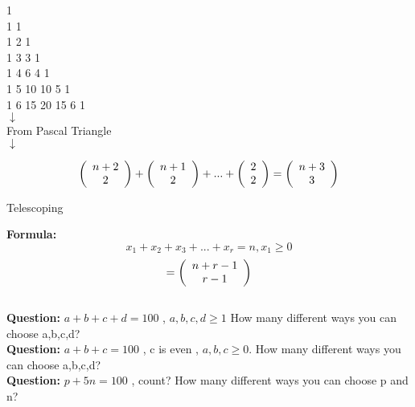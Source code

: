 \documentclass[11pt]{article}
\begin{document}
\begin{center}
1\\1 1\\1 2 1\\1 3 3 1\\1 4 6 4 1\\1 5 10 10 5 1\\1 6 15 20 15 6 1\\
$\downarrow$\\
From Pascal Triangle\\
$\downarrow$
\end{center}

$$\left( {\begin{array}{*{20}c} n+2  \\ 2  \\ \end{array}} \right) + \left( {\begin{array}{*{20}c} n+1  \\ 2  \\ \end{array}} \right) + ... + \left( {\begin{array}{*{20}c} 2  \\ 2  \\ \end{array}} \right) = \left( {\begin{array}{*{20}c} n+3 \\ 3  \\ \end{array}} \right)$$
\begin{center}
Telescoping
\end{center}

\textbf{Formula: } $$x_1 + x_2 + x_3 + ... + x_r = n , x_1 \geq 0$$ $$= \left( {\begin{array}{*{20}c} n+r-1 \\ r-1 \\ \end{array}} \right)$$\
\\

\textbf{Question: }  $a+b+c+d = 100$ , $a,b,c,d \geq 1$ How many different ways you can choose a,b,c,d?
\\ %

\textbf{Question: }  $a+b+c = 100$ , c is even , $a,b,c \geq 0$. How many different ways you can choose a,b,c,d?
\\ %

\textbf{Question: }  $p+5n = 100$ , count? How many different ways you can choose p and n?
\\ %
\end{document}

